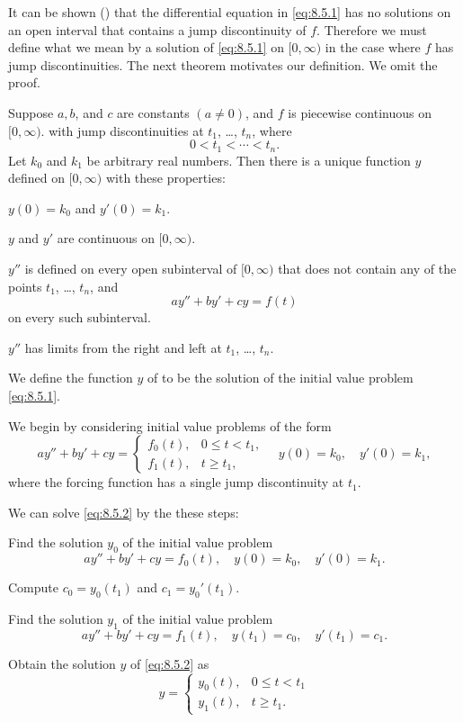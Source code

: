 It can be shown () that the
differential equation in \eqref{eq:8.5.1} has no solutions on
an open interval that contains a jump discontinuity of $f$. Therefore we
must define what we mean by a solution of \eqref{eq:8.5.1} on $[0,\infty)$
in the case where $f$ has jump discontinuities. The next theorem
motivates our definition. We omit the proof.

\begin{theorem}\label{thmtype:8.5.1}
Suppose $a,b$, and $c$ are constants $(a\ne0)$, and $f$ is
piecewise  continuous on $[0,\infty)$. with jump discontinuities
at $t_1$, \dots, $t_n$, where
\[
0<t_1<\cdots<t_n.
\]
 Let $k_0$ and $k_1$ be arbitrary real numbers. Then there
is a unique function $y$ defined on $[0,\infty)$ with these
properties:
\begin{alist}
\item %
 $y(0)=k_0$ and  $y'(0)=k_1$.
\item %
 $y$ and $y'$  are continuous on $[0,\infty)$.
\item %
$y''$ is defined
on every open subinterval of $[0,\infty)$ that does not contain any of the
points $t_1$, \dots, $t_n$, and
\[
ay''+by'+cy=f(t)
\]
on every such subinterval.
\item %
$y''$ has limits from the right and left at $t_1$, \dots, $t_n$.
\end{alist}
\end{theorem}

We define the function $y$  of   to be the
solution of the initial value problem \eqref{eq:8.5.1}.

We begin by considering initial value problems of the form
\begin{equation}\label{eq:8.5.2}
ay''+by'+cy=\begin{cases}
f_0(t),&0\le t<t_1,\\
f_1(t),&t\ge t_1,
\end{cases}\quad y(0)=k_0,\quad y'(0)=k_1,
\end{equation}
where the forcing function has a single jump discontinuity at $t_1$.

We can solve \eqref{eq:8.5.2} by  the these steps:
\begin{enumext}[label=\arabic*,wrap-label*={Step #1.},labelwidth=4em]
\item Find the solution $y_0$ of  the initial value problem
\[ay''+by'+cy=f_0(t), \quad  y(0)=k_0,\quad y'(0)=k_1.\]
\item Compute $c_0=y_0(t_1)$ and $c_1=y_0'(t_1)$.
\item Find the solution $y_1$ of  the initial value problem
\[ay''+by'+cy=f_1(t), \quad  y(t_1)=c_0,\quad y'(t_1)=c_1.\]
\item Obtain the solution $y$ of  \eqref{eq:8.5.2} as
\[
y=
\begin{cases}
y_0(t),&0\le t<t_1\\
y_1(t),&t\ge t_1.
\end{cases}
\]
\end{enumext}


